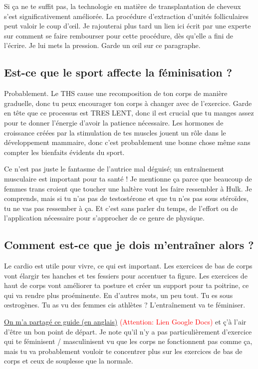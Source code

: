 \documentclass{article}
\begin{document}
Si ça ne te suffit pas, la technologie en matière de transplantation de cheveux s'est significativement améliorée. La procédure d'extraction d'unités folliculaires peut valoir le coup d'œil. Je rajouterai plus tard un lien ici écrit par une experte sur comment se faire rembourser pour cette procédure, dès qu'elle a fini de l'écrire. Je lui mets la pression. Garde un œil sur ce paragraphe. 

\subsection{Est-ce que le sport affecte la féminisation ?}

Probablement. Le THS cause une recomposition de ton corps de manière graduelle, donc tu peux encourager ton corps à changer avec de l'exercice. Garde en tête que ce processus est TRES LENT, donc il est crucial que tu manges assez pour te donner l'énergie d'avoir la patience nécessaire. Les hormones de croissance créées par la stimulation de tes muscles jouent un rôle dans le développement mammaire, donc c'est probablement une bonne chose même sans compter les bienfaits évidents du sport.

Ce n'est pas juste le fantasme de l'autrice mal déguisé; un entraînement musculaire est important pour ta santé ! Je mentionne ça parce que beaucoup de femmes trans croient que toucher une haltère vont les faire ressembler à Hulk. Je comprends, mais si tu n'as pas de testostérone et que tu n'es pas sous stéroïdes, tu ne vas pas ressember à ça. Et c'est sans parler du temps, de l'effort ou de l'application nécessaire pour s'approcher de ce genre de physique.

\subsection{Comment est-ce que je dois m'entraîner alors ?}\label{11-16}

Le cardio est utile pour vivre, ce qui est important. Les exercices de bas de corps vont élargir tes hanches et tes fessiers pour accentuer ta figure. Les exercices de haut de corps vont améliorer ta posture et créer un support pour ta poitrine, ce qui va rendre plus proéminente. En d'autres mots, un peu tout. Tu es sous œstrogènes. Tu as vu des femmes cis athlètes ? L'entraînement va te féminiser.

\href{https://docs.google.com/document/d/1-NyE5EY5TTaRRMhk7HlTbKJ7HifjEsA4jlDO1qKQVl0/edit?tab=t.0}{On m'a partagé ce guide (en anglais)} \textcolor{red}{(Attention: Lien Google Docs)} et ç'à l'air d'être un bon point de départ. Je note qu'il n'y a pas particulièrement d'exercice qui te féminisent / masculinisent vu que les corps ne fonctionnent pas comme ça, mais tu va probablement vouloir te concentrer plus sur les exercices de bas de corps et ceux de souplesse que la normale.  
\end{document}

